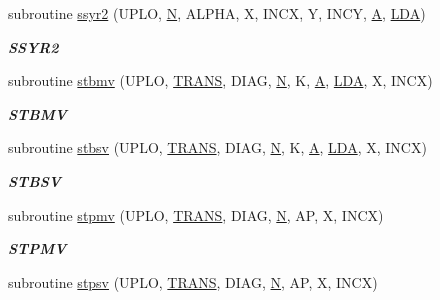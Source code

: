 \begin{DoxyCompactItemize}
subroutine \hyperlink{group__single__blas__level2_gafeb94d36b0bb94a6f87a0576e339434d}{ssyr2} (U\+P\+L\+O, \hyperlink{polmisc_8c_a0240ac851181b84ac374872dc5434ee4}{N}, A\+L\+P\+H\+A, X, I\+N\+C\+X, Y, I\+N\+C\+Y, \hyperlink{classA}{A}, \hyperlink{example__user_8c_ae946da542ce0db94dced19b2ecefd1aa}{L\+D\+A})
\begin{DoxyCompactList}\small\item\em {\bfseries S\+S\+Y\+R2} \end{DoxyCompactList}\item 
subroutine \hyperlink{group__single__blas__level2_gab1000098b0929f8256ced0ab89141b31}{stbmv} (U\+P\+L\+O, \hyperlink{superlu__enum__consts_8h_a0c4e17b2d5cea33f9991ccc6a6678d62a1f61e3015bfe0f0c2c3fda4c5a0cdf58}{T\+R\+A\+N\+S}, D\+I\+A\+G, \hyperlink{polmisc_8c_a0240ac851181b84ac374872dc5434ee4}{N}, K, \hyperlink{classA}{A}, \hyperlink{example__user_8c_ae946da542ce0db94dced19b2ecefd1aa}{L\+D\+A}, X, I\+N\+C\+X)
\begin{DoxyCompactList}\small\item\em {\bfseries S\+T\+B\+M\+V} \end{DoxyCompactList}\item 
subroutine \hyperlink{group__single__blas__level2_ga0b99dd14ccf41601cd3fcfd0675535dd}{stbsv} (U\+P\+L\+O, \hyperlink{superlu__enum__consts_8h_a0c4e17b2d5cea33f9991ccc6a6678d62a1f61e3015bfe0f0c2c3fda4c5a0cdf58}{T\+R\+A\+N\+S}, D\+I\+A\+G, \hyperlink{polmisc_8c_a0240ac851181b84ac374872dc5434ee4}{N}, K, \hyperlink{classA}{A}, \hyperlink{example__user_8c_ae946da542ce0db94dced19b2ecefd1aa}{L\+D\+A}, X, I\+N\+C\+X)
\begin{DoxyCompactList}\small\item\em {\bfseries S\+T\+B\+S\+V} \end{DoxyCompactList}\item 
subroutine \hyperlink{group__single__blas__level2_ga7bbe5634d34a5fcb12d877e700e0ac86}{stpmv} (U\+P\+L\+O, \hyperlink{superlu__enum__consts_8h_a0c4e17b2d5cea33f9991ccc6a6678d62a1f61e3015bfe0f0c2c3fda4c5a0cdf58}{T\+R\+A\+N\+S}, D\+I\+A\+G, \hyperlink{polmisc_8c_a0240ac851181b84ac374872dc5434ee4}{N}, A\+P, X, I\+N\+C\+X)
\begin{DoxyCompactList}\small\item\em {\bfseries S\+T\+P\+M\+V} \end{DoxyCompactList}\item 
subroutine \hyperlink{group__single__blas__level2_gae6fb0355e398779dc593ced105ce373d}{stpsv} (U\+P\+L\+O, \hyperlink{superlu__enum__consts_8h_a0c4e17b2d5cea33f9991ccc6a6678d62a1f61e3015bfe0f0c2c3fda4c5a0cdf58}{T\+R\+A\+N\+S}, D\+I\+A\+G, \hyperlink{polmisc_8c_a0240ac851181b84ac374872dc5434ee4}{N}, A\+P, X, I\+N\+C\+X)

\end{DoxyCompactItemize}
